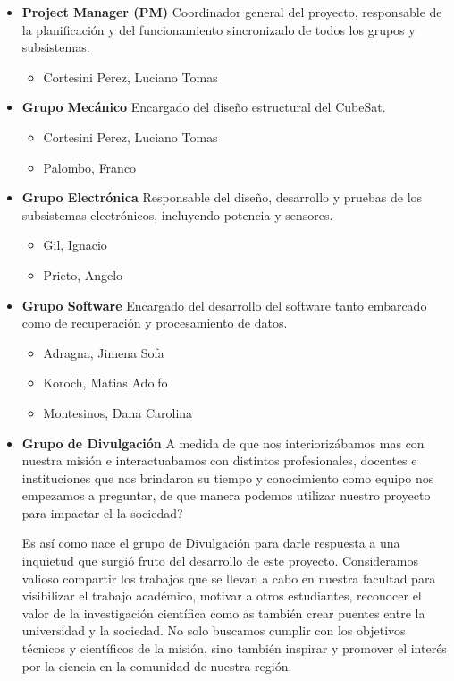       \begin{itemize}
        \item \textbf{Project Manager (PM)}
          Coordinador general del proyecto, responsable de la planificación y del funcionamiento
          sincronizado de todos los grupos y subsistemas.
          \begin{itemize}
            \item Cortesini Perez, Luciano Tomas
          \end{itemize}
        \item \textbf{Grupo Mecánico}
         Encargado del diseño estructural del CubeSat.
          \begin{itemize}
            \item Cortesini Perez, Luciano Tomas
            \item Palombo, Franco
          \end{itemize}
        \item \textbf{Grupo Electrónica}
          Responsable del diseño, desarrollo y pruebas de los subsistemas electrónicos, incluyendo
          potencia y sensores.
          \begin{itemize}
            \item Gil, Ignacio
            \item Prieto, Angelo
          \end{itemize}
          \item \textbf{Grupo Software}
          Encargado del desarrollo del software tanto embarcado como de recuperación y procesamiento de datos.
          \begin{itemize}
            \item Adragna, Jimena Sofa
            \item Koroch, Matias Adolfo
            \item Montesinos, Dana Carolina
          \end{itemize}
        \item \textbf{Grupo de Divulgación}
          A medida de que nos interiorizábamos mas con nuestra misión e interactuabamos con
          distintos profesionales, docentes e instituciones que nos brindaron su tiempo y conocimiento
          como equipo nos empezamos a preguntar, de que manera podemos utilizar
          nuestro proyecto para impactar el la sociedad?

          Es así como nace el grupo de Divulgación para darle respuesta a una inquietud que
          surgió fruto del desarrollo de este proyecto. Consideramos valioso compartir los trabajos
          que se llevan a cabo en nuestra facultad para visibilizar el trabajo académico, motivar
          a otros estudiantes, reconocer el valor de la investigación científica como as también
          crear puentes entre la universidad y la sociedad. No solo buscamos cumplir con los
          objetivos técnicos y científicos de la misión, sino también inspirar y promover el interés
          por la ciencia en la comunidad de nuestra región.


\end{itemize}
